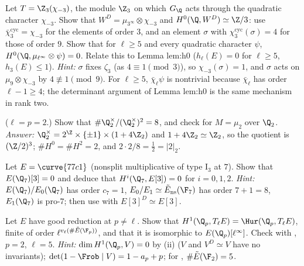 \begin{exercise}\label{ex:galcoh:ex-h3}
Let $T=\Z_3(\chi_{-3})$, the module $\Z_3$ on which $G_\Q$ acts through the quadratic character $\chi_{-3}$. Show that $W^D=\mu_{3^\infty}\otimes\chi_{-3}$ and
$H^0(\Q,W^D)\simeq\Z/3$: use $\bar\chi_3^{\mathrm{cyc}}=\chi_{-3}$ for the elements of order $3$, and an element $\sigma$ with $\chi_3^{\mathrm{cyc}}(\sigma)=4$ for those of order $9$. Show that for
$\ell\ge5$ and every quadratic character $\psi$, $H^0(\Q,\mu_{\ell^\infty}\otimes\psi)=0$. Relate this to Lemma lem:h0 ($h_\ell(E)=0$ for $\ell\ge5$, $h_3(E)\le1$).
\emph{Hint:} $\sigma$ fixes $\zeta_3$ (as $4\equiv1\pmod3$), so $\chi_{-3}(\sigma)=1$, and $\sigma$ acts on $\mu_9\otimes\chi_{-3}$ by $4\not\equiv1\pmod9$. For $\ell\ge5$, $\bar\chi_\ell\psi$ is nontrivial because
$\bar\chi_\ell$ has order $\ell-1\ge4$; the determinant argument of Lemma lem:h0 is the same mechanism in rank two.
\end{exercise}

\begin{exercise}\label{ex:galcoh:ex-q2}
($\ell=p=2$.) Show that $\#\Q_2^\times/(\Q_2^\times)^2=8$, and check  for $M=\mu_2$ over $\Q_2$. \emph{Answer:} $\Q_2^\times=2^{\Z}\times\{\pm1\}\times(1+4\Z_2)$ and
$1+4\Z_2\simeq\Z_2$, so the quotient is $(\Z/2)^3$; $\#H^0=\#H^2=2$, and $2\cdot2/8=\frac12=|2|_2$.
\end{exercise}

\begin{exercise}\label{ex:galcoh:ex-77c1}
Let $E=\curve{77c1}$ (nonsplit multiplicative of type $\mathrm I_3$ at $7$). Show that $E(\Q_7)[3]=0$ and deduce that $H^i(\Q_7,E[3])=0$ for $i=0,1,2$. \emph{Hint:}
$E(\Q_7)/E_0(\Q_7)$ has order $c_7=1$, $E_0/E_1\simeq\tilde E_{\mathrm{ns}}(\F_7)$ has order $7+1=8$, $E_1(\Q_7)$ is pro-$7$; then use
 with $E[3]^D\simeq E[3]$.
\end{exercise}

\begin{exercise}\label{ex:galcoh:ex-good-h1}
Let $E$ have good reduction at $p\ne\ell$. Show that $H^1(\Q_p,T_\ell E)=\Hur(\Q_p,T_\ell E)$, finite of order $\ell^{v_\ell(\#\tilde E(\F_p))}$, and that it is isomorphic to $E(\Q_p)[\ell^\infty]$.
Check with , $p=2$, $\ell=5$. \emph{Hint:} $\dim H^1(\Q_p,V)=0$ by (ii) ($V$ and $V^D\simeq V$ have no invariants); $\det(1-\Frob\mid V)=1-a_p+p$;
for , $\#\tilde E(\F_2)=5$.
\end{exercise}

